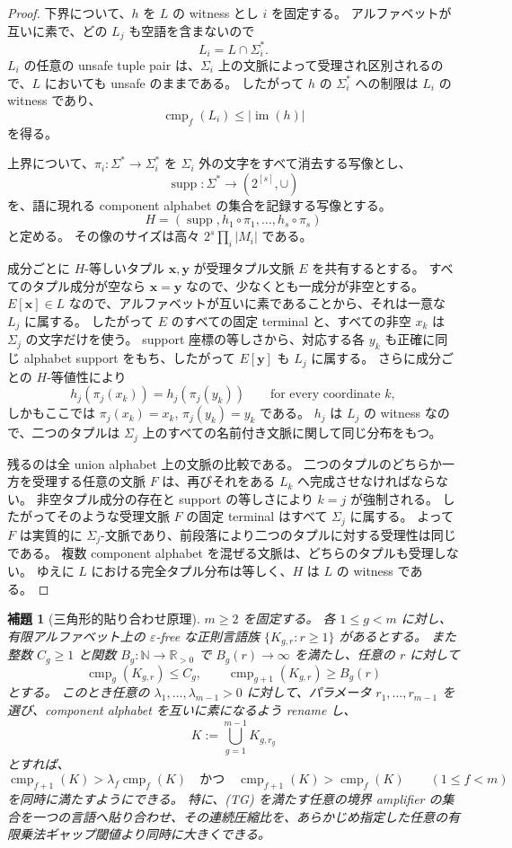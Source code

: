 \documentclass[10pt,a4paper]{ltjsarticle}
\newtheorem{lemma}[theorem]{補題}
\theoremstyle{definition}
\theoremstyle{remark}
\newcommand{\cmp}{\operatorname{cmp}}
\begin{document}
\begin{proof}
下界について、$h$ を $L$ の witness とし $i$ を固定する。
アルファベットが互いに素で、どの $L_j$ も空語を含まないので
\[
L_i=L\cap\Sigma_i^*.
\]
$L_i$ の任意の unsafe tuple pair は、$\Sigma_i$ 上の文脈によって受理され区別されるので、$L$ においても unsafe のままである。
したがって $h$ の $\Sigma_i^*$ への制限は $L_i$ の witness であり、
\[
\cmp_f(L_i)\le|\operatorname{im}(h)|
\]
を得る。

上界について、$\pi_i:\Sigma^*\to\Sigma_i^*$ を $\Sigma_i$ 外の文字をすべて消去する写像とし、
\[
\operatorname{supp}:\Sigma^*\longrightarrow(2^{[s]},\cup)
\]
を、語に現れる component alphabet の集合を記録する写像とする。
\[
H=(\operatorname{supp},h_1\circ\pi_1,\ldots,h_s\circ\pi_s)
\]
と定める。
その像のサイズは高々
$2^s\prod_i|M_i|$
である。

成分ごとに $H$-等しいタプル $\mathbf x,\mathbf y$ が受理タプル文脈 $E$ を共有するとする。
すべてのタプル成分が空なら $\mathbf x=\mathbf y$ なので、少なくとも一成分が非空とする。
$E[\mathbf x]\in L$ なので、アルファベットが互いに素であることから、それは一意な $L_j$ に属する。
したがって $E$ のすべての固定 terminal と、すべての非空 $x_k$ は $\Sigma_j$ の文字だけを使う。
support 座標の等しさから、対応する各 $y_k$ も正確に同じ alphabet support をもち、したがって $E[\mathbf y]$ も $L_j$ に属する。
さらに成分ごとの $H$-等値性により
\[
h_j(\pi_j(x_k))=h_j(\pi_j(y_k))
\qquad\text{for every coordinate }k,
\]
しかもここでは $\pi_j(x_k)=x_k$, $\pi_j(y_k)=y_k$ である。
$h_j$ は $L_j$ の witness なので、二つのタプルは $\Sigma_j$ 上のすべての名前付き文脈に関して同じ分布をもつ。

残るのは全 union alphabet 上の文脈の比較である。
二つのタプルのどちらか一方を受理する任意の文脈 $F$ は、再びそれをある $L_k$ へ完成させなければならない。
非空タプル成分の存在と support の等しさにより $k=j$ が強制される。
したがってそのような受理文脈 $F$ の固定 terminal はすべて $\Sigma_j$ に属する。
よって $F$ は実質的に $\Sigma_j$-文脈であり、前段落により二つのタプルに対する受理性は同じである。
複数 component alphabet を混ぜる文脈は、どちらのタプルも受理しない。
ゆえに $L$ における完全タプル分布は等しく、$H$ は $L$ の witness である。
\end{proof}

\begin{lemma}[三角形的貼り合わせ原理]
\label{vab:lem:triangular-gluing}
$m\ge2$ を固定する。
各 $1\le g<m$ に対し、有限アルファベット上の $\varepsilon$-free な正則言語族
$\{K_{g,r}:r\ge1\}$
があるとする。
また整数 $C_g\ge1$ と関数
$B_g:\mathbb N\to\mathbb R_{>0}$
で $B_g(r)\to\infty$ を満たし、任意の $r$ に対して
\[
\cmp_g(K_{g,r})\le C_g,
\qquad
\cmp_{g+1}(K_{g,r})\ge B_g(r)
\tag{TG}
\]
とする。
このとき任意の
$\lambda_1,\ldots,\lambda_{m-1}>0$
に対して、パラメータ $r_1,\ldots,r_{m-1}$ を選び、component alphabet を互いに素になるよう rename し、
\[
K:=\bigcup_{g=1}^{m-1}K_{g,r_g}
\]
とすれば、
\[
\cmp_{f+1}(K)>\lambda_f\cmp_f(K)
\quad\text{かつ}\quad
\cmp_{f+1}(K)>\cmp_f(K)
\qquad(1\le f<m)
\]
を同時に満たすようにできる。
特に、\textup{(TG)} を満たす任意の境界 amplifier の集合を一つの言語へ貼り合わせ、その連続圧縮比を、あらかじめ指定した任意の有限乗法ギャップ閾値より同時に大きくできる。
\end{lemma}
\end{document}
